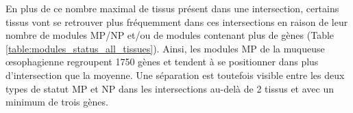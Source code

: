 

En plus de ce nombre maximal de tissus présent dans une intersection, certains tissus vont se retrouver plus fréquemment dans ces intersections en raison de leur nombre de modules MP/NP et/ou de modules contenant plus de gènes (Table \ref{table:modules_status_all_tissues}).
Ainsi, les modules MP de la muqueuse œsophagienne regroupent 1750 gènes et tendent à se positionner dans plus d'intersection que la moyenne. Une séparation est toutefois visible entre les deux types de statut MP et NP dans les intersections au-delà de 2 tissus et avec un minimum de trois gènes.

